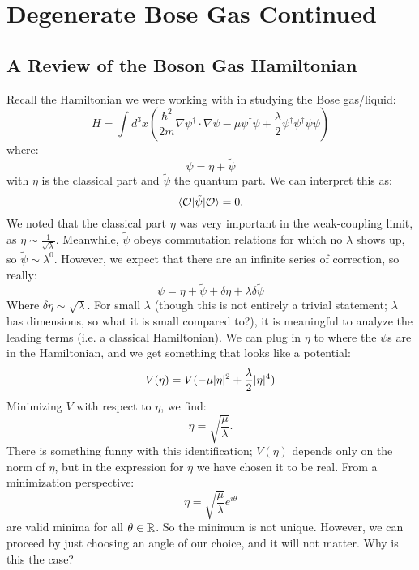 \section{Degenerate Bose Gas Continued}
\subsection{A Review of the Boson Gas Hamiltonian}
Recall the Hamiltonian we were working with in studying the Bose gas/liquid:
\begin{equation}
    H = \int d^3x\left(\frac{\hbar^2}{2m}\nabla \psi^\dag \cdot \nabla \psi - \mu \psi^\dag \psi + \frac{\lambda}{2}\psi^\dag\psi^\dag\psi\psi\right)
\end{equation}
where:
\begin{equation}
    \psi = \eta + \tilde{\psi}
\end{equation}
with $\eta$ is the classical part and $\tilde{\psi}$ the quantum part. We can interpret this as:
\begin{equation}
    \langle \mathcal{O} \rvert\tilde{\psi}\lvert \mathcal{O} \rangle = 0.
\end{equation}
We noted that the classical part $\eta$ was very important in the weak-coupling limit, as $\eta \sim \frac{1}{\sqrt{\lambda}}$. Meanwhile, $\tilde{\psi}$ obeys commutation relations for which no $\lambda$ shows up, so $\tilde{\psi} \sim \lambda^0$. However, we expect that there are an infinite series of correction, so really:
\begin{equation}
    \psi = \eta + \tilde{\psi} + \delta \eta + \lambda \delta \tilde{\psi}
\end{equation}
Where $\delta \eta \sim \sqrt{\lambda}$. For small $\lambda$ (though this is not entirely a trivial statement; $\lambda$ has dimensions, so what it is small compared to?), it is meaningful to analyze the leading terms (i.e. a classical Hamiltonian). We can plug in $\eta$ to where the $\psi$s are in the Hamiltonian, and we get something that looks like a potential:
\begin{equation}
    V(\eta) = V(-\mu\lvert \eta \rvert^2 + \frac{\lambda}{2}\lvert \eta \rvert^4)
\end{equation}
Minimizing $V$ with respect to $\eta$, we find:
\begin{equation}
    \eta = \sqrt{\frac{\mu}{\lambda}}.
\end{equation}
There is something funny with this identification; $V(\eta)$ depends only on the norm of $\eta$, but in the expression for $\eta$ we have chosen it to be real. From a minimization perspective:
\begin{equation}
    \eta = \sqrt{\frac{\mu}{\lambda}}e^{i\theta}
\end{equation}
are valid minima for all $\theta \in \mathbb{R}$. So the minimum is not unique. However, we can proceed by just choosing an angle of our choice, and it will not matter. Why is this the case? 



